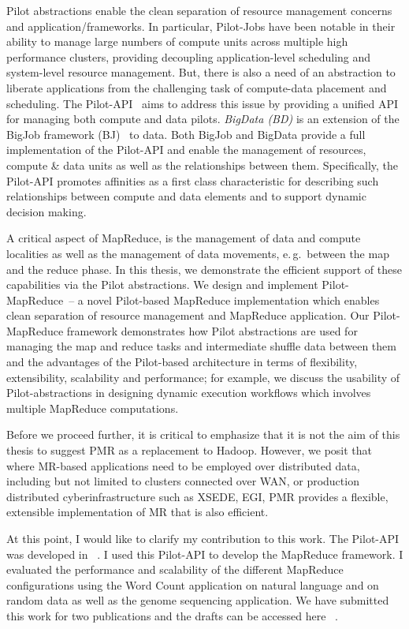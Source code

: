 \documentclass[12pt]{report}
\newcommand{\pilot}{Pilot\xspace}
\newcommand{\pilotjobs}{Pilot-Jobs\xspace}
\newcommand{\pilotmapreduce}{Pilot-MapReduce\xspace}
\begin{document}
Pilot abstractions enable the clean separation of resource management concerns and application/frameworks. In particular, \pilotjobs 
have been notable in their ability to manage large numbers of compute units across multiple high performance clusters, providing decoupling
application-level scheduling and system-level resource management. But, there is also a need of an abstraction to liberate
applications from the challenging task of compute-data placement and scheduling. The Pilot-API~\cite{pstar-2012} aims to address this issue
by providing a unified API for managing both compute and data pilots. \emph{BigData (BD)} is an extension of
the BigJob framework (BJ)~\cite{bigjob_web} to data. Both BigJob and BigData provide a full implementation of the Pilot-API and enable the
management of resources, compute \& data units as well as the relationships between them. Specifically, the Pilot-API promotes
affinities as a first class characteristic for describing such relationships between compute and data elements and to support dynamic
decision making. 

A critical aspect of MapReduce, is the management of data and compute localities as well as the management of data movements, e.\,g.\
between the map and the reduce phase.  In this thesis, we demonstrate the efficient support of these capabilities via the Pilot
abstractions. We design and implement \pilotmapreduce \ -- a novel \pilot-based MapReduce implementation which enables clean separation
of resource management and MapReduce application. Our \pilotmapreduce framework demonstrates how \pilot abstractions are used for managing the map and reduce tasks and
intermediate shuffle data between them and the advantages of the \pilot-based architecture in terms of flexibility,
extensibility, scalability and performance; for example, we discuss the usability of \pilot-abstractions in designing dynamic execution
workflows which involves multiple MapReduce computations.

Before we proceed further, it is critical to emphasize that it is not the aim of this thesis to suggest PMR as a replacement to Hadoop.
However, we posit that where MR-based applications need to be employed over distributed data, including but not limited to clusters connected
over WAN, or production distributed cyberinfrastructure such as XSEDE, EGI, PMR provides a flexible, extensible implementation of MR that is
also efficient.

At this point, I would like to clarify my contribution to this work. The Pilot-API was developed in ~\cite{pstar-2012}. 
I used this Pilot-API to develop the MapReduce framework. I evaluated the performance and scalability of the different  
MapReduce configurations using the Word Count application on natural language and on random data as well as the 
genome sequencing application. We have submitted this work for two publications and the drafts can be accessed here ~\cite{ecmls-2012, mrworkshop-2012}.
 
\end{document}
